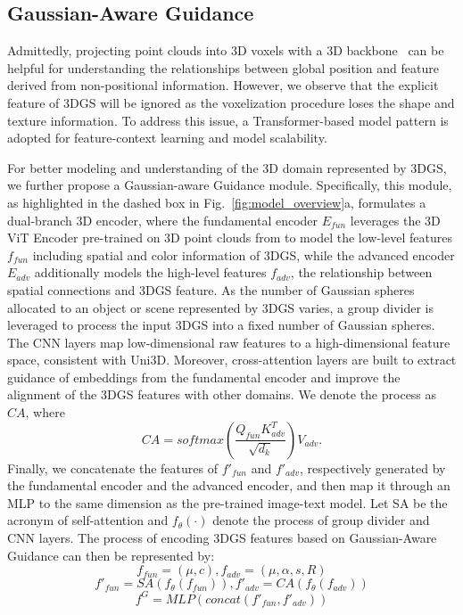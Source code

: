 \subsection{Gaussian-Aware Guidance}
\label{sec:GAG}
Admittedly, projecting point clouds into 3D voxels with a 3D backbone~\citep{qi2017pointnet, qi2017pointnet++} can be helpful for understanding the relationships between global position and feature derived from non-positional information. However, we observe that the explicit feature of 3DGS will be ignored as the voxelization procedure loses the shape and texture information. To address this issue, a Transformer-based model pattern is adopted for feature-context learning and model scalability. 

For better modeling and understanding of the 3D domain represented by 3DGS, we further propose a Gaussian-aware Guidance module. Specifically, this module, as highlighted in the dashed box in Fig.~\ref{fig:model_overview}a, formulates a dual-branch 3D encoder, where the fundamental encoder $E_{fun}$ leverages the 3D ViT Encoder pre-trained on 3D point clouds from \citep{zhou2024uni3d} to model the low-level features $f_{fun}$ including spatial and color information  of 3DGS, while the advanced encoder $E_{adv}$ additionally models the high-level features $f_{adv}$, the relationship between spatial connections and 3DGS feature. 
As the number of Gaussian spheres allocated to an object or scene represented by 3DGS varies, a group divider is leveraged to process the input 3DGS into a fixed number of Gaussian spheres.
The CNN layers map low-dimensional raw features to a high-dimensional feature space, consistent with Uni3D. Moreover, cross-attention layers are built to extract guidance of embeddings from the fundamental encoder and improve the alignment of the 3DGS features with other domains. We denote the process as $CA$, where
\begin{equation}
    CA = softmax(\frac{Q_{fun}K_{adv}^T}{\sqrt{d_k}})V_{adv}.
\end{equation}
Finally, we concatenate the features of $f'_{fun}$ and $f'_{adv}$, respectively generated by the fundamental encoder and the advanced encoder, and then map it through an MLP to the same dimension as the pre-trained image-text model. 
Let SA be the acronym of self-attention and $f_{\theta}(\cdot)$ denote the process of group divider and CNN layers.
The process of encoding 3DGS features based on Gaussian-Aware Guidance can then be represented by:
\begin{equation}
    f_{fun} = (\mu,c), f_{adv} = (\mu,\alpha,s,R)
\end{equation}
\begin{equation}
    f'_{fun} = SA(f_{\theta}(f_{fun})),f'_{adv} = CA(f_{\theta}(f_{adv}))
\end{equation}
\begin{equation}
    f^{G} = MLP(concat(f'_{fun},f'_{adv}))
\end{equation}

